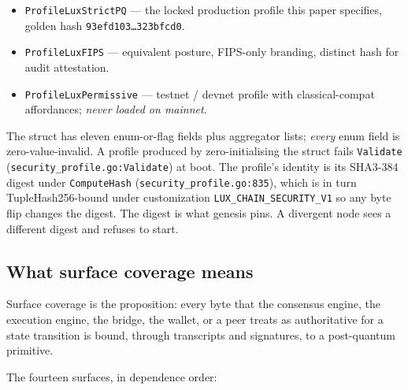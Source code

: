 \begin{itemize}[leftmargin=2em,nosep]
  \item \texttt{ProfileLuxStrictPQ} --- the locked production profile this
    paper specifies, golden hash \texttt{93efd103\ldots323bfcd0}.
  \item \texttt{ProfileLuxFIPS} --- equivalent posture, FIPS-only branding,
    distinct hash for audit attestation.
  \item \texttt{ProfileLuxPermissive} --- testnet / devnet profile with
    classical-compat affordances; \emph{never loaded on mainnet}.
\end{itemize}

The struct has eleven enum-or-flag fields plus aggregator lists; \emph{every}
enum field is zero-value-invalid. A profile produced by zero-initialising the
struct fails \texttt{Validate} (\texttt{security\_profile.go:Validate}) at
boot. The profile's identity is its SHA3-384 digest under
\texttt{ComputeHash} (\texttt{security\_profile.go:835}), which is in turn
TupleHash256-bound under customization \texttt{LUX\_CHAIN\_SECURITY\_V1} so any
byte flip changes the digest. The digest is what genesis pins. A divergent
node sees a different digest and refuses to start.

\subsection{What surface coverage means}

Surface coverage is the proposition: every byte that the consensus engine,
the execution engine, the bridge, the wallet, or a peer treats as
authoritative for a state transition is bound, through transcripts and
signatures, to a post-quantum primitive.

The fourteen surfaces, in dependence order:

